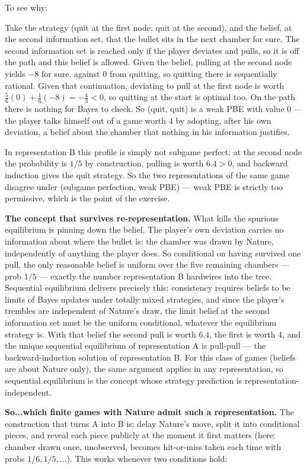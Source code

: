 \documentclass[12pt]{article}
\begin{document}
To see why:

Take the strategy (quit at the first node; quit at the second), and the belief, at the second information set, that the bullet sits in the next chamber for sure. The second information set is reached only if the player deviates and pulls, so it is off the path and this belief is allowed. Given the belief, pulling at the second node yields $-8$ for sure, against $0$ from quitting, so quitting there is sequentially rational. Given that continuation, deviating to pull at the first node is worth $\tfrac56(0) + \tfrac16(-8) = -\tfrac43 < 0$, so quitting at the start is optimal too. On the path there is nothing for Bayes to check. So (quit, quit) is a weak PBE with value $0$ --- the player talks himself out of a game worth $4$ by adopting, after his own deviation, a belief about the chamber that nothing in his information justifies. 
 
In representation B this profile is simply not subgame perfect: at the second node the probability is $1/5$ by construction, pulling is worth $6.4 > 0$, and backward induction gives the quit strategy. So the two representations of the same game disagree under (subgame perfection, weak PBE) --- weak PBE is strictly too permissive, which is the point of the exercise.
 
\textbf{The concept that survives re-representation.}
What kills the spurious equilibrium is pinning down the belief. The player's own deviation carries no information about where the bullet is: the chamber was drawn by Nature, independently of anything the player does. So conditional on having survived one pull, the only reasonable belief is uniform over the five remaining chambers --- prob $1/5$ --- exactly the number representation B hardwires into the tree. Sequential equilibrium delivers precisely this: consistency requires beliefs to be limits of Bayes updates under totally mixed strategies, and since the player's trembles are independent of Nature's draw, the limit belief at the second information set must be the uniform conditional, whatever the equilibrium strategy is. With that belief the
second pull is worth $6.4$, the first is worth $4$, and the unique sequential equilibrium of representation A is pull-pull --- the backward-induction solution of representation B. For this class of games (beliefs are about Nature only), the same argument applies in any representation, so sequential equilibrium is the concept whose strategy prediction is representation-independent.

\textbf{So...which finite games with Nature admit such a representation.}
The construction that turns A into B is: delay Nature's move, split it into conditional pieces, and reveal each piece publicly at the moment it first matters (here: chamber drawn once, unobserved, becomes hit-or-miss taken each time with probs $1/6, 1/5, \dots$). This works whenever two conditions hold:
\end{document}
